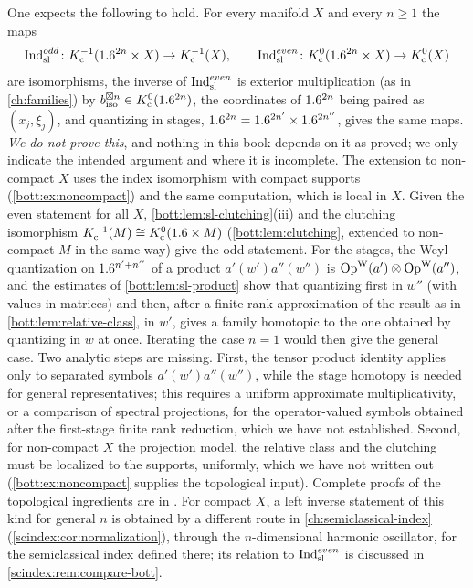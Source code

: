 \begin{remark}\label{bott:rem:sl-iso-general}
  One expects the following to hold. For every manifold $X$ and every $n\ge1$ the maps
  \begin{equation*}
    \operatorname{Ind}^{odd}_{\mathrm{sl}}\colon K_{\mathrm{c}}^{-1}(1.6^{2n}\times X)\to K_{\mathrm{c}}^{-1}(X),\qquad
    \operatorname{Ind}^{even}_{\mathrm{sl}}\colon K_{\mathrm{c}}^0(1.6^{2n}\times X)\to K_{\mathrm{c}}^0(X)
  \end{equation*}
  are isomorphisms, the inverse of $\operatorname{Ind}^{even}_{\mathrm{sl}}$ is exterior multiplication (as in
  \cref{ch:families}) by $b_{\mathrm{iso}}^{\boxtimes n}\in K_{\mathrm{c}}^0(1.6^{2n})$, the coordinates of
  $1.6^{2n}$ being paired as $(x_j,\xi_j)$, and quantizing in stages,
  $1.6^{2n}=1.6^{2n'}\times1.6^{2n''}$, gives the same maps. \emph{We do not prove this}, and
  nothing in this book depends on it as proved; we only indicate the intended argument and
  where it is incomplete. The extension to non-compact $X$ uses the index isomorphism with compact supports
  (\cref{bott:ex:noncompact}) and the same computation, which is local in $X$. Given the
  even statement for all $X$, \cref{bott:lem:sl-clutching}(iii) and the clutching
  isomorphism $K_{\mathrm{c}}^{-1}(M)\cong K_{\mathrm{c}}^0(1.6\times M)$ (\cref{bott:lem:clutching}, extended to
  non-compact $M$ in the same way) give the odd statement. For the stages, the Weyl
  quantization on $1.6^{n'+n''}$ of a product $a'(w')a''(w'')$ is
  $\operatorname{Op}^{\mathrm{W}}(a')\otimes\operatorname{Op}^{\mathrm{W}}(a'')$, and the estimates of \cref{bott:lem:sl-product} show that
  quantizing first in $w''$ (with values in matrices) and then, after a finite rank
  approximation of the result as in \cref{bott:lem:relative-class}, in $w'$, gives a
  family homotopic to the one obtained by quantizing in $w$ at once. Iterating the case
  $n=1$ would then give the general case. Two analytic steps are missing. First, the
  tensor product identity applies only to separated symbols $a'(w')a''(w'')$, while the
  stage homotopy is needed for general representatives; this requires a uniform
  approximate multiplicativity, or a comparison of spectral projections, for the
  operator-valued symbols obtained after the first-stage finite rank reduction, which we
  have not established. Second, for non-compact $X$ the projection model, the relative
  class and the clutching must be localized to the supports, uniformly, which we have not
  written out (\cref{bott:ex:noncompact} supplies the topological input). Complete proofs
  of the topological ingredients are in \cite{Atiyah-K}. For compact $X$, a left
  inverse statement of this kind for general $n$ is obtained by a different route in
  \cref{ch:semiclassical-index} (\cref{scindex:cor:normalization}), through the
  $n$-dimensional harmonic oscillator, for the semiclassical index defined there; its
  relation to $\operatorname{Ind}^{even}_{\mathrm{sl}}$ is discussed in \cref{scindex:rem:compare-bott}.
\end{remark}

